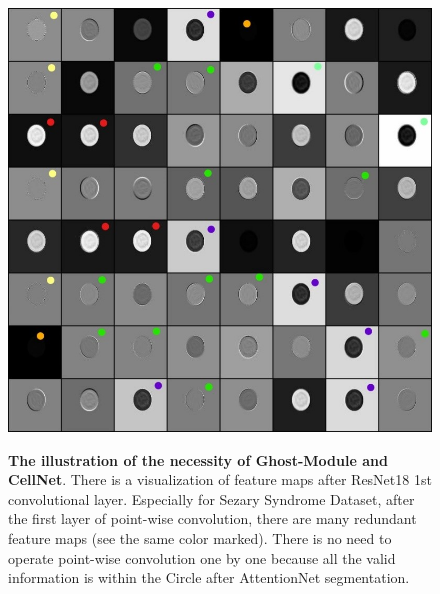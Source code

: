 \begin{figure}[t]
\begin{center}
\includegraphics[height=0.33\textheight]{thesis-template-master/images/cellnetnecc3.jpg}
\label{fig:cellnet}
\end{center}
\caption{\textbf{The illustration of the necessity of Ghost-Module and CellNet}. There is a visualization of feature maps after ResNet18\cite{20} 1st convolutional layer. Especially for Sezary Syndrome Dataset, after the first layer of point-wise convolution, there are many redundant feature maps (see the same color marked). There is no need to operate point-wise convolution one by one because all the valid information is within the Circle after AttentionNet segmentation.}
\end{figure}

